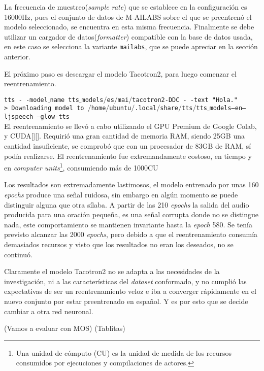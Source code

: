 La frecuencia de muestreo(\textit{sample rate}) que se establece en la configuración es 16000Hz, pues el conjunto de datos de M-AILABS sobre el que se preentrenó el modelo seleccionado, se encuentra en esta misma frecuencia. Finalmente se debe utilizar un cargador de datos(\textit{formatter}) compatible con la base de datos usada, en este caso se selecciona la variante \texttt{mailabs}, que se puede apreciar en la sección anterior.

El próximo paso es descargar el modelo Tacotron2, para luego comenzar el reentrenamiento.

\texttt{tts - -model$\_$name tts$\_$models$/$es$/$mai$/$tacotron2-DDC - -text "Hola."}\\

\texttt{> Downloading model to $/$home$/$ubuntu$/$.local$/$share$/$tts$/$tts$\_$models--en--ljspeech
	--glow-tts}\\

El reentrenamiento se llevó a cabo utilizando el GPU Premium de Google Colab, y CUDA[\cite{cuda}][\cite{cuda1}]. Requirió una gran cantidad de memoria RAM, siendo 25GB una cantidad insuficiente, se comprobó que con un procesador de 83GB de RAM, sí podía realizarse. El reentrenamiento fue extremandamente costoso, en tiempo y en \textit{computer units}\footnote{Una unidad de cómputo (CU) es la unidad de medida de los recursos consumidos por ejecuciones y compilaciones de actores.}, consumiendo más de 1000CU

Los resultados son extremadamente lastimosos, el modelo entrenado por unas 160 \textit{epochs} produce una señal ruidosa, sin embargo en algún momento se puede distinguir alguna que otra sílaba. A partir de las 210 \textit{epochs} la salida del audio producida para una oración pequeña, es una señal corrupta donde no se distingue nada, este comportamiento se mantienen invariante hasta la \textit{epoch} 580. Se tenía previsto alcanzar las 2000 \textit{epochs}, pero debido a que el reentrenamiento consumía demasiados recursos y visto que los resultados no eran los deseados, no se continuó. 

Claramente el modelo Tacotron2 no se adapta a las necesidades de la investigación, ni a las características del \textit{dataset} conformado, y no cumplió las expectativas de ser un reentrenamiento veloz e iba a converger rápidamente en el nuevo conjunto por estar preentrenado en español. Y es por esto que se decide cambiar a otra red neuronal.

(Vamos a evaluar con MOS)
(Tablitas)

